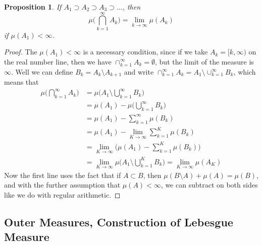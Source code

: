 \documentclass{article}
\newtheorem{proposition}[theorem]{Proposition}
\theoremstyle{remark}
\theoremstyle{definition}
\begin{document}
\begin{proposition}
If $A_1 \supset A_2 \supset A_3 \supset \ldots$, then 
\[\mu\bigg( \bigcap_{k=1}^\infty A_k \bigg) = \lim_{k \rightarrow \infty} \mu(A_k)\]
if $\mu(A_1) < \infty$. 
\end{proposition}
\begin{proof}
The $\mu(A_1) < \infty$ is a necessary condition, since if we take $A_k = [k, \infty)$ on the real number line, then we have $\cap_{k=1}^\infty A_k = \emptyset$, but the limit of the measure is $\infty$. Well we can define $B_k = A_k \setminus A_{k+1}$ and write $\cap_{k=1}^\infty A_k = A_1 \setminus \cup_{k=1}^\infty B_k$, which means that 
\begin{align*}
    \mu\bigg( \bigcap_{k=1}^\infty A_k \bigg) & = \mu\bigg( A_1 \setminus \bigcup_{k=1}^\infty B_k \bigg) \\
    & = \mu(A_1) - \mu\bigg( \bigcup_{k=1}^\infty B_k\bigg) \\
    & = \mu(A_1) - \sum_{k=1}^\infty \mu(B_k) \\
    & = \mu(A_1) - \lim_{K \rightarrow \infty} \sum_{k=1}^K \mu(B_k) \\
    & = \lim_{K \rightarrow \infty} \bigg( \mu(A_1) - \sum_{k=1}^K \mu(B_k) \bigg) \\
    & = \lim_{K \rightarrow \infty} \mu \bigg( A_1 \setminus \bigcup_{k=1}^K B_k \bigg) = \lim_{K \rightarrow \infty} \mu(A_K)
\end{align*}
Now the first line uses the fact that if $A \subset B$, then $\mu(B \setminus A) + \mu(A) = \mu(B)$, and with the further assumption that $\mu(A) < \infty$, we can subtract on both sides like we do with regular arithmetic. 
\end{proof}

\subsection{Outer Measures, Construction of Lebesgue Measure}
\end{document}
